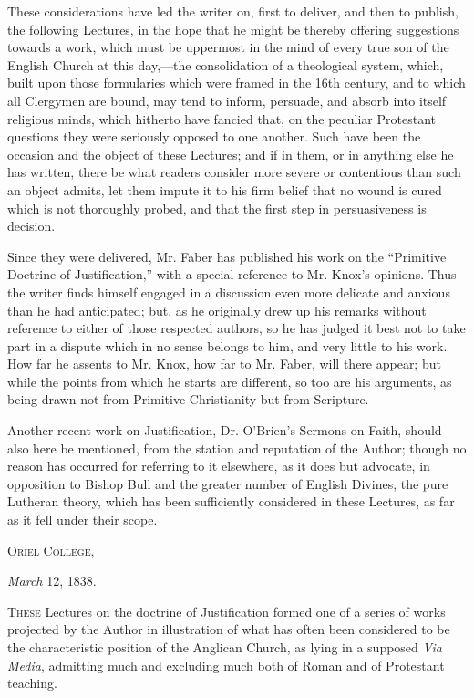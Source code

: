 These considerations have led the writer on, first to deliver, and
then to publish, the following Lectures, in the hope that he might be
thereby offering suggestions towards a work, which must be uppermost
in the mind of every true son of the English Church at this day,—the
consolidation of a theological system, which, built upon those
formularies which were framed in the 16th century, and to which all
Clergymen are bound, may tend to inform, persuade, and absorb into
itself religious minds, which hitherto have fancied that, on the
peculiar Protestant questions they were seriously opposed to one
another. Such have been the occasion and the object of these Lectures;
and if in them, or in anything else he has written, there be what
readers consider more severe or contentious than such an object
admits, let them impute it to his firm belief that no wound is cured
which is not thoroughly probed, and that the first step in
persuasiveness is decision.


Since they were delivered, Mr. Faber has published his work on the
``Primitive Doctrine of Justification,'' with a special
reference to Mr. Knox's opinions. Thus the writer finds himself
engaged in a discussion even more delicate and anxious than he had
anticipated; but, as he originally drew up his remarks without
reference to either of those respected authors, so he has judged it
best not to take part in a dispute which in no sense belongs to him,
and very little to his work. How far he assents to Mr. Knox, how far
to Mr. Faber, will there appear; but while the points from which he
starts are different, so too are his arguments, as being drawn not
from Primitive Christianity but from Scripture.


Another recent work on Justification, Dr. O'Brien's Sermons on
Faith, should also here be mentioned, from the station and reputation
of the Author; though no reason has occurred for referring to it
elsewhere, as it does but advocate, in opposition to Bishop Bull and
the greater number of English Divines, the pure Lutheran theory, which
has been sufficiently considered in these Lectures, as far as it fell
under their scope.


O\textsc{riel} C\textsc{ollege},

\emph{March} 12, 1838.








T\textsc{hese} Lectures on the doctrine of Justification formed one of a
series of works projected by the Author in illustration of what has
often been considered to be the characteristic position of the
Anglican Church, as lying in a supposed \emph{Via Media}, admitting
much and excluding much both of Roman and of Protestant teaching.


